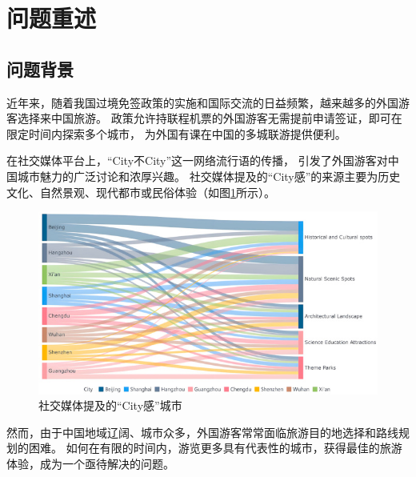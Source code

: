 \documentclass[withoutpreface,bwprint]{cumcmthesis} %
\begin{document}
\tableofcontents

\newpage %

\section{问题重述}

\subsection{问题背景}
近年来，随着我国过境免签政策的实施和国际交流的日益频繁，越来越多的外国游客选择来中国旅游。
政策允许持联程机票的外国游客无需提前申请签证，即可在限定时间内探索多个城市，
为外国有课在中国的多城联游提供便利\cite{shanghai2013}。



在社交媒体平台上，“City不City”这一网络流行语的传播，
引发了外国游客对中国城市魅力的广泛讨论和浓厚兴趣。
社交媒体提及的“City感”的来源主要为历史文化、自然景观、现代都市或民俗体验（如图\ref{fig:City不City}所示）。

\begin{figure}[H]
    \centering
    \includegraphics[width=1.0\textwidth]{figures/image/city_city.jpg}
    \caption{社交媒体提及的“City感”城市\cite{sun2024}}
    \label{fig:City不City}
\end{figure}


然而，由于中国地域辽阔、城市众多，外国游客常常面临旅游目的地选择和路线规划的困难。
如何在有限的时间内，游览更多具有代表性的城市，获得最佳的旅游体验，成为一个亟待解决的问题。
\end{document}
